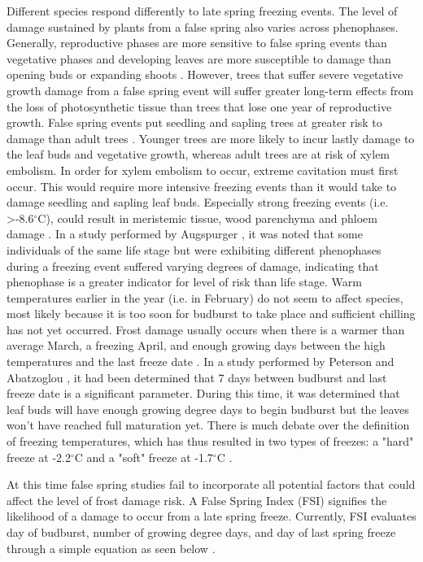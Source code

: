 \documentclass{article}\usepackage[]{graphicx}\usepackage[]{color}
\begin{document}
Different species respond differently to late spring freezing events. The level of damage sustained by plants from a false spring also varies across phenophases. Generally, reproductive phases are more sensitive to false spring events than vegetative phases and developing leaves are more susceptible to damage than opening buds or expanding shoots \citep{Lenz2013,Augspurger2009}
. However, trees that suffer severe vegetative growth damage from a false spring event will suffer greater long-term effects from the loss of photosynthetic tissue than trees that lose one year of reproductive growth. False spring events put seedling and sapling trees at greater risk to damage than adult trees \citep{Vitasse2014}. Younger trees are more likely to incur lastly damage to the leaf buds and vegetative growth, whereas adult trees are at risk of xylem embolism. In order for xylem embolism to occur, extreme cavitation must first occur. This would require more intensive freezing events than it would take to damage seedling and sapling leaf buds. Especially strong freezing events (i.e. >-8.6$^{\circ}$C), could result in meristemic tissue, wood parenchyma and phloem damage \citep{Lenz2013, Augspurger2011, Sakai1987}. In a study performed by Augspurger %
, it was noted that some individuals of the same life stage but were exhibiting different phenophases during a freezing event suffered varying degrees of damage, indicating that phenophase is a greater indicator for level of risk than life stage. 
Warm temperatures earlier in the year (i.e. in February) do not seem to affect species, most likely because it is too soon for budburst to take place and sufficient chilling has not yet occurred. Frost damage usually occurs when there is a warmer than average March, a freezing April, and enough growing days between the high temperatures and the last freeze date \citep{Augspurger2013}. 
In a study performed by Peterson and Abatzoglou %
, it had been determined that 7 days between budburst and last freeze date is a significant parameter. During this time, it was determined that leaf buds will have enough growing degree days to begin budburst but the leaves won't have reached full maturation yet. There is much debate over the definition of freezing temperatures, which has thus resulted in two types of freezes: a "hard" freeze at -2.2$^{\circ}$C and a "soft" freeze at -1.7$^{\circ}$C \citep{Augspurger2013, Kodra2011, Vavrus2006}.

At this time false spring studies fail to incorporate all potential factors that could affect the level of frost damage risk. A False Spring Index (FSI) signifies the likelihood of a damage to occur from a late spring freeze. Currently, FSI evaluates day of budburst, number of growing degree days, and day of last spring freeze through a simple equation as seen below \citep{Marino2011}. 
\end{document}
